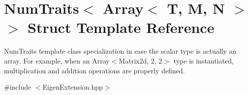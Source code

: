 \hypertarget{struct_eigen_1_1_num_traits_3_01_array_3_01_t_00_01_m_00_01_n_01_4_01_4}{\section{Num\-Traits$<$ Array$<$ T, M, N $>$ $>$ Struct Template Reference}
\label{struct_eigen_1_1_num_traits_3_01_array_3_01_t_00_01_m_00_01_n_01_4_01_4}
}


Num\-Traits template class specialization in case the scalar type is actually an array. For example, when an Array$<$\-Matrix2d, 2, 2$>$ type is instantiated, multiplication and addition operations are properly defined.  




{\ttfamily \#include $<$Eigen\-Extension.\-hpp$>$}


